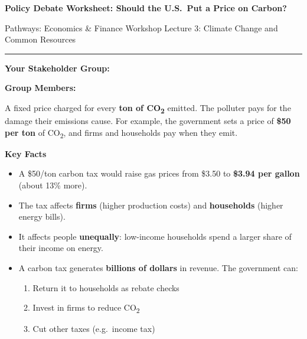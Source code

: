 \documentclass[letterpaper,10pt]{article}
\begin{document}
\begin{center}
  {\Large\textbf{Policy Debate Worksheet: Should the U.S.\ Put a Price on Carbon?}}

  \vspace{0.3em}
  {\small Pathways: Economics \& Finance Workshop \hfill Lecture 3: Climate Change and Common Resources}
\end{center}

\vspace{0.3em}
\hrule
\vspace{0.5em}

\textbf{Your Stakeholder Group:} \hrulefill

\vspace{0.3em}
\textbf{Group Members:} \hrulefill

\vspace{0.8em}

\begin{definitionbox}
  A fixed price charged for every \textbf{ton of CO\textsubscript{2}} emitted.
  The polluter pays for the damage their emissions cause.
  For example, the government sets a price of \textbf{\$50 per ton} of CO\textsubscript{2}, and firms and households pay when they emit.
\end{definitionbox}

\vspace{0.5em}

\textbf{Key Facts}
\begin{itemize}
  \item A \$50/ton carbon tax would raise gas prices from \$3.50 to \textbf{\$3.94 per gallon} (about 13\% more).
  \item The tax affects \textbf{firms} (higher production costs) and \textbf{households} (higher energy bills).
  \item It affects people \textbf{unequally}: low-income households spend a larger share of their income on energy.
  \item A carbon tax generates \textbf{billions of dollars} in revenue. The government can:
    \begin{enumerate}
      \item Return it to households as rebate checks
      \item Invest in firms to reduce CO\textsubscript{2}
      \item Cut other taxes (e.g.\ income tax)
    \end{enumerate}
\end{itemize}
\end{document}
